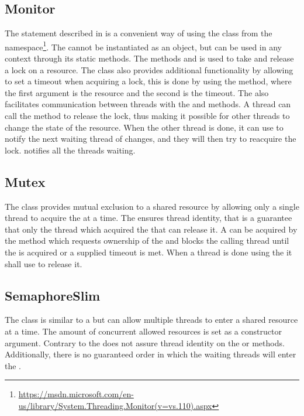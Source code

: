 \subsection{Monitor}
The  statement described in  is a convenient way of using the  class from the  namespace\footnote{\url{https://msdn.microsoft.com/en-us/library/System.Threading.Monitor(v=vs.110).aspx}}. The  cannot be instantiated as an object, but can be used in any context through its static methods. The methods  and  is used to take and release a lock on a resource. The  class also provides additional functionality by allowing to set a timeout when acquiring a lock, this is done by using the  method, where the first argument is the resource and the second is the timeout. The  also facilitates communication between threads with the   and  methods. A thread can call the  method to release the lock, thus making it possible for other threads to change the state of the resource. When the other thread is done, it can use  to notify the next waiting thread of changes, and they will then try to reacquire the lock.  notifies all the threads waiting.
\subsection{Mutex}
The  class provides mutual exclusion to a shared resource by allowing only a single thread to acquire the  at a time. The  ensures thread identity, that is a guarantee that only the thread which acquired the  that can release it. A  can be acquired by the method  which requests ownership of the  and blocks the calling thread until the  is acquired or a supplied timeout is met. When a thread is done using the  it shall use  to release it.

\subsection{SemaphoreSlim}
The  class is similar to a  but can allow multiple threads to enter a shared resource at a time. The amount of concurrent allowed resources is set as a constructor argument. Contrary to  the  does not assure thread identity on the  or  methods. Additionally, there is no guaranteed order in which the waiting threads will enter the . 

